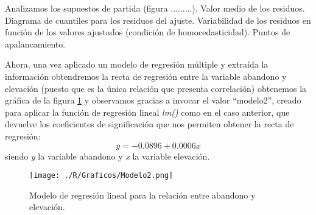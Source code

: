 \documentclass[11pt,a4paper]{article}
\begin{document}
Analizamos los supuestos de partida (figura .........). Valor medio de los residuos. Diagrama de cuantiles para los residuos del ajuste. Variabilidad de los residuos en función de los valores ajustados (condición de homocedasticidad). Puntos de apalancamiento.

Ahora, una vez aplicado un modelo de regresión múltiple y extraída la información obtendremos la recta de regresión entre la variable abandono y elevación (puesto que es la única relación que presenta correlación) obtenemos la gráfica de la figura \ref{fig:lm2} y observamos gracias a invocar el valor ``modelo2'', creado para aplicar la función de regresión lineal \textit{lm()} como en el caso anterior, que devuelve los coeficientes de significación que nos permiten obtener la recta de regresión:
\begin{equation}
y=-0.0896+0.0006x
\label{eq:regre.elev}
\end{equation}
\noindent siendo \textit{y} la variable abandono y \textit{x} la variable elevación.

\begin{figure}
	\centering
	\texttt{[image: ./R/Graficos/Modelo2.png]}
	\caption{Modelo de regresión lineal para la relación entre abandono y elevación.}
	\label{fig:lm2}
\end{figure}
\end{document}
